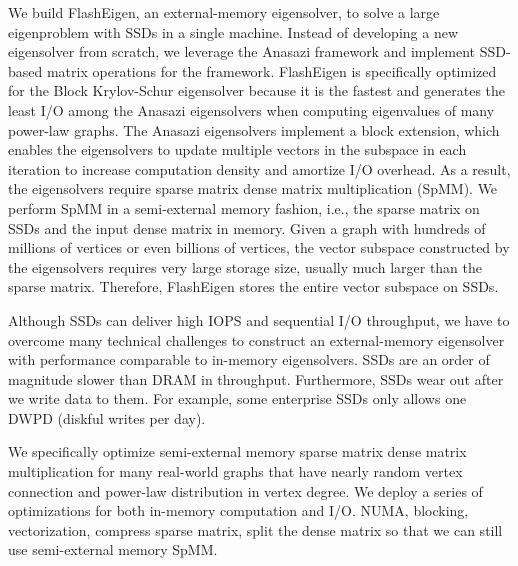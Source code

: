 
We build FlashEigen, an external-memory eigensolver, to solve a large eigenproblem
with SSDs in a single machine. 
Instead of developing a new eigensolver from scratch, we leverage
the Anasazi framework and implement SSD-based matrix operations
for the framework. FlashEigen is specifically optimized for the Block
Krylov-Schur \cite{krylovschur} eigensolver because it is the fastest and
generates the least I/O among the Anasazi eigensolvers when computing
eigenvalues of many power-law graphs. The Anasazi eigensolvers implement
a block extension, which enables the eigensolvers to update multiple vectors
in the subspace in each iteration to increase computation density and amortize
I/O overhead. As a result, the eigensolvers require sparse matrix dense matrix
multiplication (SpMM). We perform SpMM in a semi-external memory fashion, i.e.,
the sparse matrix on SSDs and the input dense matrix in memory. Given a graph
with hundreds of millions of vertices or even billions of vertices,
the vector subspace constructed by the eigensolvers requires very large storage
size, usually much larger than the sparse matrix. Therefore, FlashEigen stores
the entire vector subspace on SSDs.

Although SSDs can deliver high IOPS and sequential I/O throughput, we have
to overcome many technical challenges to construct an external-memory
eigensolver with performance comparable to in-memory eigensolvers.
SSDs are an order of magnitude slower than DRAM in throughput. Furthermore,
SSDs wear out after we write data to them. For example, some enterprise SSDs
\cite{} only allows one DWPD (diskful writes per day).

We specifically optimize semi-external memory sparse matrix dense matrix
multiplication for many real-world graphs that have nearly random vertex
connection and power-law distribution in vertex degree. We deploy a series of
optimizations for both in-memory computation and I/O.
NUMA, blocking, vectorization, compress sparse matrix, split the dense matrix
so that we can still use semi-external memory SpMM.

